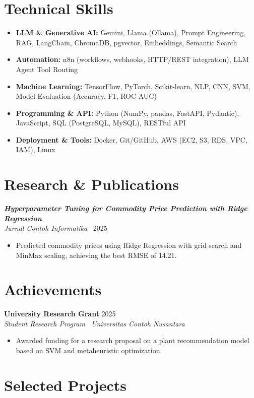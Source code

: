 \documentclass[a4paper,11pt]{article}
\newcommand{\resumeItem}[1]{\item\small{#1}}
\newcommand{\resumeSubheading}[4]{
  \vspace{2pt}
  \noindent\textbf{#1} \hfill #2 \\
  \noindent\textit{\small #3} \hfill \textit{\small #4}
  \vspace{-4pt}
}
\newcommand{\resumePubHeading}[3]{
  \vspace{2pt}
  \noindent\textbf{#1} \\
  \noindent\small{\textit{#2} \textemdash\ #3}
  \vspace{-4pt}
}
\begin{document}
\section{Technical Skills}
\begin{itemize}
  \resumeItem{\textbf{LLM \& Generative AI:} Gemini, Llama (Ollama), Prompt Engineering, RAG, LangChain, ChromaDB, pgvector, Embeddings, Semantic Search}
  \resumeItem{\textbf{Automation:} n8n (workflows, webhooks, HTTP/REST integration), LLM Agent Tool Routing}
  \resumeItem{\textbf{Machine Learning:} TensorFlow, PyTorch, Scikit-learn, NLP, CNN, SVM, Model Evaluation (Accuracy, F1, ROC-AUC)}
  \resumeItem{\textbf{Programming \& API:} Python (NumPy, pandas, FastAPI, Pydantic), JavaScript, SQL (PostgreSQL, MySQL), RESTful API}
  \resumeItem{\textbf{Deployment \& Tools:} Docker, Git/GitHub, AWS (EC2, S3, RDS, VPC, IAM), Linux}
\end{itemize}

\section{Research \& Publications}

\resumePubHeading
    {\textit{Hyperparameter Tuning for Commodity Price Prediction with Ridge Regression}}
    {Jurnal Contoh Informatika}
    {2025}
\begin{itemize}
  \resumeItem{Predicted commodity prices using Ridge Regression with grid search and MinMax scaling, achieving the best RMSE of 14.21.}
\end{itemize}

\section{Achievements}

\resumeSubheading
    {University Research Grant}{2025}
    {Student Research Program \textemdash\ Universitas Contoh Nusantara}{}
\begin{itemize}
  \resumeItem{Awarded funding for a research proposal on a plant recommendation model based on SVM and metaheuristic optimization.}
\end{itemize}

\section{Selected Projects}
\end{document}
